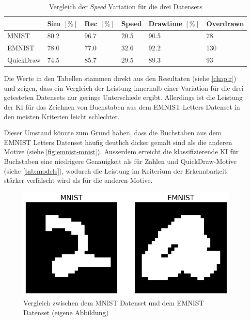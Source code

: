 \begin{table}[!ht]
    \centering
    \caption{Vergleich der \emph{Speed} Variation für die drei Datensets}\label{tab:speed-3-dataset}
    \begin{tabular}{|l|l|l|l|l|l|}
            \hline
            \hline ~ & Sim $[\%]$ & Rec $[\%]$ & Speed & Drawtime $[\%]$ & Overdrawn \\ \hline
            MNIST & 80.2 & 96.7 & 20.5 & 90.5 & 78 \\ \hline
            EMNIST & 78.0 & 77.0 & 32.6 & 92.2 & 130 \\ \hline
            QuickDraw & 74.5 & 85.7 & 29.5 & 89.3 & 93 \\ \hline
        \end{tabular}
\end{table}

Die Werte in den Tabellen stammen direkt aus den Resultaten (siehe \ref{chap:r})
und zeigen, dass ein Vergleich der Leistung innerhalb einer Variation für die
drei getesteten Datensets nur geringe Unterschiede ergibt. Allerdings ist die
Leistung der KI für das Zeichnen von Buchstaben aus dem EMNIST Letters Datenset
in den meisten Kriterien leicht schlechter.

Dieser Umstand könnte zum Grund haben, dass die Buchstaben aus dem EMNIST
Letters Datenset häufig deutlich dicker gemalt sind als die anderen Motive
(siehe \autoref{fig:emnist-mnist}). Ausserdem erreicht die klassifizierende KI
für Buchstaben eine niedrigere Genauigkeit als für Zahlen und QuickDraw-Motive
(siehe \autoref{tab:models}), wodurch die Leistung im Kriterium der
Erkennbarkeit stärker verfälscht wird als für die anderen Motive.

\begin{figure}[!ht]
	\centering
	\includegraphics[width=\textwidth-2cm]{images/diskussion/emnist-mnist.png}
	\caption{Vergleich zwischen dem MNIST Datenset und dem EMNIST Datenset
	(eigene Abbildung)}\label{fig:emnist-mnist}
\end{figure}
  

